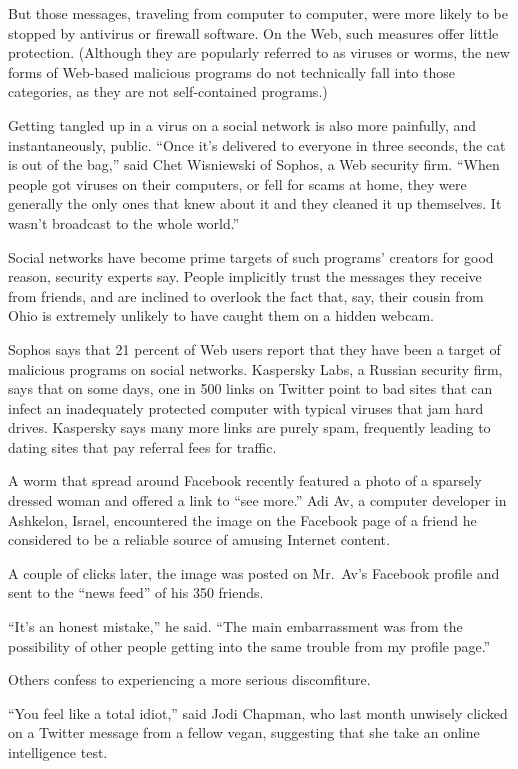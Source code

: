 ﻿\documentclass[12pt]{article}
\begin{document}
But those messages, traveling from computer to computer, were more likely to be stopped by antivirus
or firewall software. On the Web, such measures offer little protection. (Although they are
popularly referred to as viruses or worms, the new forms of Web-based malicious programs do not
technically fall into those categories, as they are not self-contained programs.)

Getting tangled up in a virus on a social network is also more painfully, and instantaneously,
public. ``Once it's delivered to everyone in three seconds, the cat is out of the bag,'' said Chet
Wisniewski of Sophos, a Web security firm. ``When people got viruses on their computers, or fell for
scams at home, they were generally the only ones that knew about it and they cleaned it up
themselves. It wasn't broadcast to the whole world.''

Social networks have become prime targets of such programs' creators for good reason, security
experts say. People implicitly trust the messages they receive from friends, and are inclined to
overlook the fact that, say, their cousin from Ohio is extremely unlikely to have caught them on a
hidden webcam.

Sophos says that 21 percent of Web users report that they have been a target of malicious programs
on social networks. Kaspersky Labs, a Russian security firm, says that on some days, one in 500
links on Twitter point to bad sites that can infect an inadequately protected computer with typical
viruses that jam hard drives. Kaspersky says many more links are purely spam, frequently leading to
dating sites that pay referral fees for traffic.

A worm that spread around Facebook recently featured a photo of a sparsely dressed woman and offered
a link to ``see more.'' Adi Av, a computer developer in Ashkelon, Israel, encountered the image on
the Facebook page of a friend he considered to be a reliable source of amusing Internet content.

A couple of clicks later, the image was posted on Mr.~Av's Facebook profile and sent to the ``news
feed'' of his 350 friends.

``It's an honest mistake,'' he said. ``The main embarrassment was from the possibility of other
people getting into the same trouble from my profile page.''

Others confess to experiencing a more serious discomfiture.

``You feel like a total idiot,'' said Jodi Chapman, who last month unwisely clicked on a Twitter
message from a fellow vegan, suggesting that she take an online intelligence test.
\end{document}
